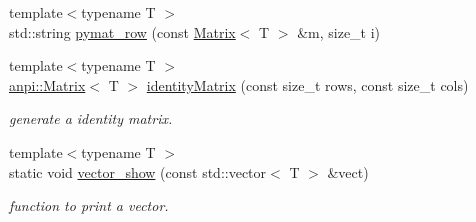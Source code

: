 \begin{DoxyCompactItemize}
\item 
{\footnotesize template$<$typename T $>$ }\\std\+::string \hyperlink{namespaceanpi_a924781fa0b7a5031d898921010dbd01c}{pymat\+\_\+row} (const \hyperlink{classanpi_1_1Matrix}{Matrix}$<$ T $>$ \&m, size\+\_\+t i)
\item 
{\footnotesize template$<$typename T $>$ }\\\hyperlink{classanpi_1_1Matrix}{anpi\+::\+Matrix}$<$ T $>$ \hyperlink{namespaceanpi_abbb8fed95bcd00af841bd25da38893b0}{identity\+Matrix} (const size\+\_\+t rows, const size\+\_\+t cols)
\begin{DoxyCompactList}\small\item\em generate a identity matrix. \end{DoxyCompactList}\item 
{\footnotesize template$<$typename T $>$ }\\static void \hyperlink{namespaceanpi_ad64921bbe93aae4680e7283db73b136d}{vector\+\_\+show} (const std\+::vector$<$ T $>$ \&vect)
\begin{DoxyCompactList}\small\item\em function to print a vector. \end{DoxyCompactList}\end{DoxyCompactItemize}
